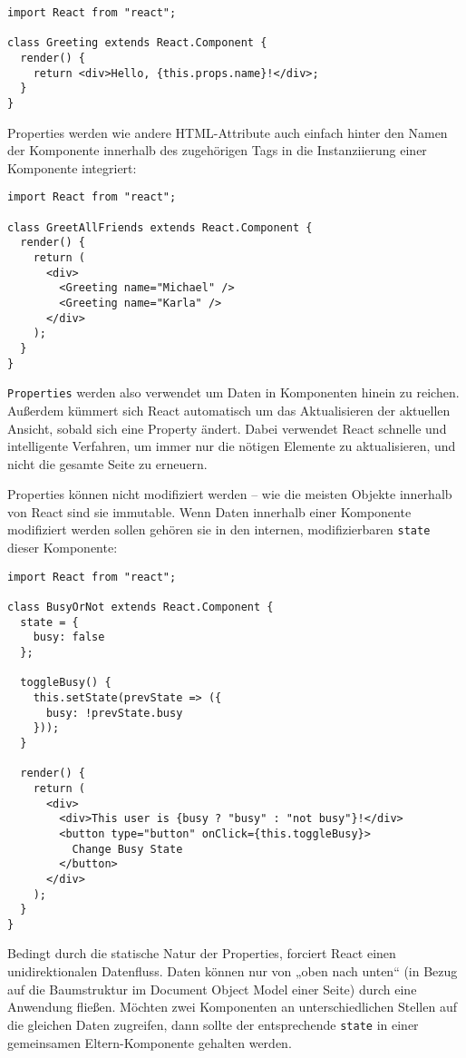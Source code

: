 \begin{lstlisting}
import React from "react";

class Greeting extends React.Component {
  render() {
    return <div>Hello, {this.props.name}!</div>;
  }
}
\end{lstlisting}

Properties werden wie andere HTML-Attribute auch einfach hinter den Namen der Komponente innerhalb des zugehörigen Tags in die Instanziierung einer Komponente integriert:

\begin{lstlisting}
import React from "react";

class GreetAllFriends extends React.Component {
  render() {
    return (
      <div>
        <Greeting name="Michael" />
        <Greeting name="Karla" />
      </div>
    );
  }
}
\end{lstlisting}

\texttt{Properties} werden also verwendet um Daten in Komponenten hinein zu reichen. Außerdem kümmert sich React automatisch um das Aktualisieren der aktuellen Ansicht, sobald sich eine Property ändert. Dabei verwendet React schnelle und intelligente Verfahren, um immer nur die nötigen Elemente zu aktualisieren, und nicht die gesamte Seite zu erneuern.

Properties können nicht modifiziert werden – wie die meisten Objekte innerhalb von React sind sie immutable. Wenn Daten innerhalb einer Komponente modifiziert werden sollen gehören sie in den internen, modifizierbaren \texttt{state} dieser Komponente:

\begin{lstlisting}
import React from "react";

class BusyOrNot extends React.Component {
  state = {
    busy: false
  };

  toggleBusy() {
    this.setState(prevState => ({
      busy: !prevState.busy
    }));
  }

  render() {
    return (
      <div>
        <div>This user is {busy ? "busy" : "not busy"}!</div>
        <button type="button" onClick={this.toggleBusy}>
          Change Busy State
        </button>
      </div>
    );
  }
}
\end{lstlisting}
Bedingt durch die statische Natur der Properties, forciert React einen unidirektionalen Datenfluss. Daten können nur von „oben nach unten“ (in Bezug auf die Baumstruktur im Document Object Model einer Seite) durch eine Anwendung fließen. Möchten zwei Komponenten an unterschiedlichen Stellen auf die gleichen Daten zugreifen, dann sollte der entsprechende \texttt{state} in einer gemeinsamen Eltern-Komponente gehalten werden. \newline


